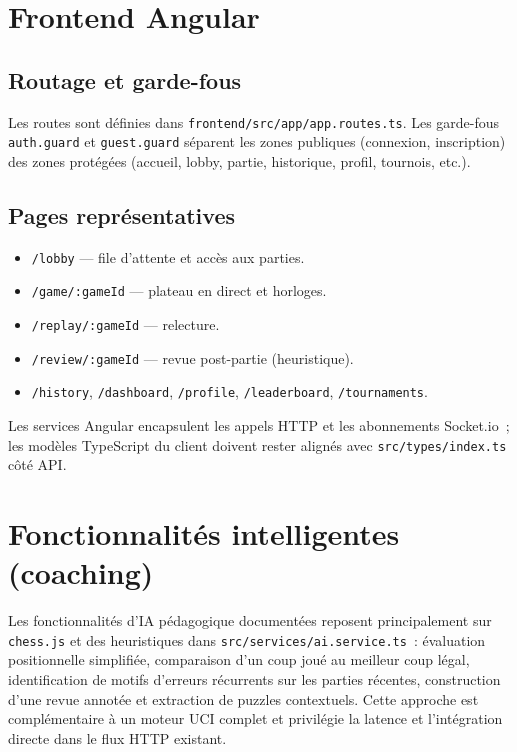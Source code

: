 \documentclass[11pt,a4paper]{report}
\begin{document}
\chapter{Frontend Angular}

\section{Routage et garde-fous}

Les routes sont définies dans \texttt{frontend/src/app/app.routes.ts}. Les garde-fous \texttt{auth.guard} et \texttt{guest.guard} séparent les zones publiques (connexion, inscription) des zones protégées (accueil, lobby, partie, historique, profil, tournois, etc.).

\section{Pages représentatives}

\begin{itemize}[leftmargin=*]
  \item \texttt{/lobby} — file d'attente et accès aux parties.
  \item \texttt{/game/:gameId} — plateau en direct et horloges.
  \item \texttt{/replay/:gameId} — relecture.
  \item \texttt{/review/:gameId} — revue post-partie (heuristique).
  \item \texttt{/history}, \texttt{/dashboard}, \texttt{/profile}, \texttt{/leaderboard}, \texttt{/tournaments}.
\end{itemize}

Les services Angular encapsulent les appels HTTP et les abonnements Socket.io~; les modèles TypeScript du client doivent rester alignés avec \texttt{src/types/index.ts} côté API.

\chapter{Fonctionnalités intelligentes (coaching)}

Les fonctionnalités d'IA pédagogique documentées reposent principalement sur \texttt{chess.js} et des heuristiques dans \texttt{src/services/ai.service.ts}~: évaluation positionnelle simplifiée, comparaison d'un coup joué au meilleur coup légal, identification de motifs d'erreurs récurrents sur les parties récentes, construction d'une revue annotée et extraction de puzzles contextuels. Cette approche est complémentaire à un moteur UCI complet et privilégie la latence et l'intégration directe dans le flux HTTP existant.
\end{document}
